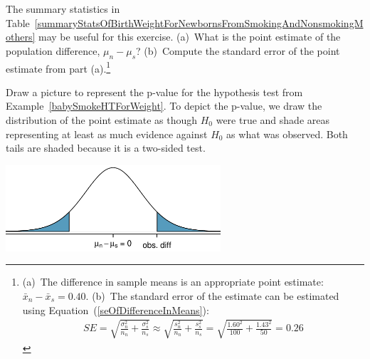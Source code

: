 {\begin{exercise}
The summary statistics in Table~\ref{summaryStatsOfBirthWeightForNewbornsFromSmokingAndNonsmokingMothers} may be useful for this exercise. (a)~What is the point estimate of the population difference, $\mu_{n} - \mu_{s}$? (b)~Compute the standard error of the point estimate from part (a).\footnote{(a)~The difference in sample means is an appropriate point estimate: $\bar{x}_{n} - \bar{x}_{s} = 0.40$. (b)~The standard error of the estimate can be estimated using Equation~(\ref{seOfDifferenceInMeans}):
\begin{eqnarray*}
SE = \sqrt{\frac{\sigma_n^2}{n_n} + \frac{\sigma_s^2}{n_s}}
	\approx \sqrt{\frac{s_n^2}{n_n} + \frac{s_s^2}{n_s}}
	= \sqrt{\frac{1.60^2}{100} + \frac{1.43^2}{50}}
	= 0.26
\end{eqnarray*}}
\end{exercise}

\textC{\newpage}

\begin{example}{Draw a picture to represent the p-value for the hypothesis test from Example~\ref{babySmokeHTForWeight}.} \label{pictureOfPValueForEstimateOfDiffOfMeansOfBirthWeights}
To depict the p-value, we draw the distribution of the point estimate as though $H_0$ were true and shade areas representing at least as much evidence against $H_0$ as what was observed. Both tails are shaded because it is a two-sided test.
\begin{center}
\includegraphics[width=0.6\textwidth]{ch_inference_for_means/figures/distOfDiffOfSampleMeansForBWOfBabySmokeData/distOfDiffOfSampleMeansForBWOfBabySmokeData}
\end{center}
\end{example}

}
